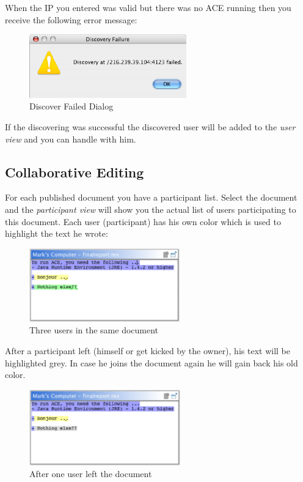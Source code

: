\documentclass[11pt,a4paper]{article}
\begin{document}
When the IP you entered was valid but there was no ACE running then you receive the following error message:

\begin{figure}[H]
\begin{center}
  \includegraphics[height= 1.08in, width=2.68in]{../images/usermanual/discover_failed_no_ace.eps}
\caption{Discover Failed Dialog}
\end{center}
\end{figure}

If the discovering was successful the discovered user will be added to the \textit{user view} and you can handle with him.

\subsection{Collaborative Editing}
\label{collaborative_editing}
For each published document you have a participant list. Select the document and the \textit{participant view} will show you the actual list of users participating to this document. Each user (participant) has his own color which is used to highlight the text he wrote:

\begin{figure}[H]
\begin{center}
  \includegraphics[height=1.25in, width=2.56in]{../images/usermanual/editor_collab_3users.eps}
\caption{Three users in the same document}
\end{center}
\end{figure}

After a participant left (himself or get kicked by the owner), his text will be highlighted grey. In case he joins the document again he will gain back his old color.

\begin{figure}[H]
\begin{center}
  \includegraphics[height=1.29in, width=2.57in]{../images/usermanual/editor_collab_user_left.eps}
\caption{After one user left the document}
\end{center}
\end{figure}
\end{document}
